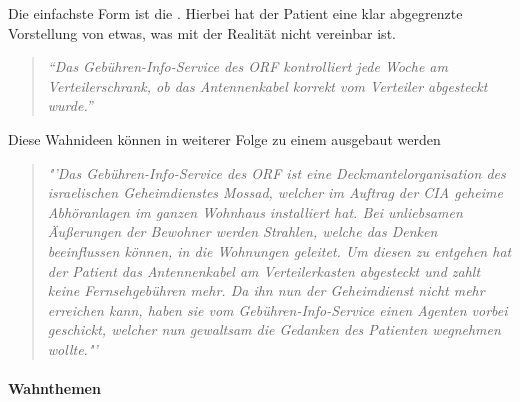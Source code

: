 Die einfachste Form ist die . Hierbei hat der
Patient eine klar abgegrenzte Vorstellung von etwas, was mit
der Realität nicht vereinbar ist. 

\begin{quotation}
\emph{"`Das
Gebühren-Info-Service des ORF kontrolliert jede Woche am
Verteilerschrank, ob das Antennenkabel korrekt vom
Verteiler abgesteckt wurde."'}
\end{quotation}

Diese Wahnideen können in weiterer Folge zu einem
 ausgebaut werden 



\begin{quotation}
\emph{"'Das Gebühren-Info-Service
des ORF ist eine Deckmantelorganisation des israelischen
Geheimdienstes Mossad, welcher im Auftrag der CIA geheime
Abhöranlagen im ganzen Wohnhaus installiert hat. Bei
unliebsamen Äußerungen der Bewohner werden Strahlen, welche
das Denken beeinflussen können, in die Wohnungen geleitet.
Um diesen zu entgehen hat der Patient das Antennenkabel am
Verteilerkasten abgesteckt und zahlt keine Fernsehgebühren
mehr. Da ihn nun der Geheimdienst nicht mehr erreichen
kann, haben sie vom Gebühren-Info-Service einen Agenten
vorbei geschickt, welcher nun gewaltsam die Gedanken des
Patienten wegnehmen wollte."'}
\end{quotation}

\paragraph{Wahnthemen} 


